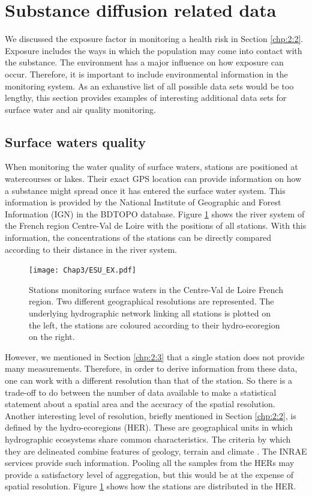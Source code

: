 \section{Substance diffusion related data}\label{chp:2:4}

We discussed the exposure factor in monitoring a health risk in Section \ref{chp:2:2}. Exposure includes the ways in which the population may come into contact with the substance. The environment has a major influence on how exposure can occur. Therefore, it is important to include environmental information in the monitoring system. As an exhaustive list of all possible data sets would be too lengthy, this section provides examples of interesting additional data sets for surface water and air quality monitoring.

\subsection{Surface waters quality}

When monitoring the water quality of surface waters, stations are positioned at watercourses or lakes. Their exact GPS location can provide information on how a substance might spread once it has entered the surface water system. This information is provided by the National Institute of Geographic and Forest Information (IGN) in the BDTOPO database. Figure \ref{fig:esu_ex} shows the river system of the French region Centre-Val de Loire with the positions of all stations. With this information, the concentrations of the stations can be directly compared according to their distance in the river system. 

\begin{figure}[ht]
    \centering
    \texttt{[image: Chap3/ESU\_EX.pdf]}
    \caption{Stations monitoring surface waters in the Centre-Val de Loire French region. Two different geographical resolutions are represented. The underlying hydrographic network linking all stations is plotted on the left, the stations are coloured according to their hydro-ecoregion on the right.}
    \label{fig:esu_ex}
\end{figure}

However, we mentioned in Section \ref{chp:2:3} that a single station does not provide many measurements. Therefore, in order to derive information from these data, one can work with a different resolution than that of the station. So there is a trade-off to do between the number of data available to make a statistical statement about a spatial area and the accuracy of the spatial resolution. Another interesting level of resolution, briefly mentioned in Section \ref{chp:2:2}, is defined by the hydro-ecoregions (HER). These are geographical units in which hydrographic ecosystems share common characteristics. The criteria by which they are delineated combine features of geology, terrain and climate \cite{wasson:hal-02580774}. The INRAE services provide such information. Pooling all the samples from the HERs may provide a satisfactory level of aggregation, but this would be at the expense of spatial resolution. Figure \ref{fig:esu_ex} shows how the stations are distributed in the HER.

